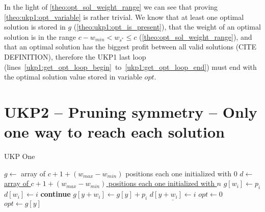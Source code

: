 \documentclass[12pt]{article}
\begin{document}
In the light of \autoref{theo:opt_sol_weight_range} we can see that proving \autoref{theo:ukp1:opt_variable} is rather trivial. We know that at least one optimal solution is stored in \(g\) (\autoref{theo:ukp1:opt_is_present}), that the weight of an optimal solution is in the range \(c - w_{min} < w_{s^*} \leq c\) (\autoref{theo:opt_sol_weight_range}), and that an optimal solution has the biggest profit between all valid solutions (CITE DEFINITION), therefore the UKP1 last loop (lines~\ref{ukp1:get_opt_loop_begin}~to~\ref{ukp1:get_opt_loop_end}) must end with the optimal solution value stored in variable \(opt\).

\section{UKP2 -- Pruning symmetry -- Only one way to reach each solution}

\begin{algorithm}[H]
\caption{UKP One}\label{alg:ukp1}
\begin{algorithmic}[1]
  \State \(g \gets\) array of \(c + 1 + (w_{max} - w_{min})\) positions each one initialized with \(0\)\label{ukp2:create_g}
  \State \underline{\(d \gets\) array of \(c + 1 + (w_{max} - w_{min})\) positions each one initialized with \(n\)\label{ukp2:create_d}}
  \State %
  \label{ukp2:begin_trivial_bounds}
      \State \(g[w_i] \gets p_i\)
      \State \underline{\(d[w_i] \gets i\)}
    \EndIf
  \EndFor\label{ukp2:end_trivial_bounds}
  \State %
  \label{ukp2:main_ext_loop_begin}
    \label{ukp2:if_equal_to_zero}
    	\State \textbf{continue}
    \EndIf\label{ukp2:if_equal_to_zero}
    \State %
    \label{ukp2:main_inner_loop_begin}
      \label{ukp2:if_better_solution_begin}
        \State \(g[y + w_i] \gets g[y] + p_i\)
        \State \(\underline{d[y + w_i] \gets i}\)
      \EndIf\label{ukp2:if_better_solution_end}
    \EndFor\label{ukp2:main_inner_loop_end}
  \EndFor\label{ukp2:main_ext_loop_end}
  \State %
  \State \(opt \gets 0\)
  \label{ukp2:get_opt_loop_begin}
    \label{ukp2:opt_loop_if}
      \State \(opt \gets g[y]\)
    \EndIf
  \EndFor\label{ukp2:get_opt_loop_end}
\EndProcedure
\end{algorithmic}
\end{algorithm}
\end{document}
